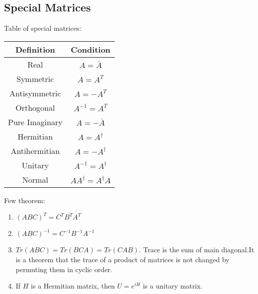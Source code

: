 \documentclass[../main.tex]{subfiles}
\begin{document}
\subsection*{Special Matrices}
Table of special matrices:
\begin{center}
    \begin{tabular}{ c c  }
     Definition & Condition  \\ 
     \hline
     Real & $A=\bar{A}$  \\  
     Symmetric & $A=A^T$ \\     
     Antisymmetric & $A=-A^T$ \\
     Orthogonal & $A^{-1}=A^T$ \\
     Pure Imaginary & $A=-\bar{A}$ \\
     Hermitian & $A=A^{\dagger}$ \\
     Antihermitian & $A=-A^{\dagger}$\\
     Unitary & $A^{-1}=A^{\dagger}$\\
     Normal & $AA^{\dagger}=A^{\dagger}A$
    \end{tabular}
\end{center}

Few theorem:
\begin{enumerate}
    \item $(ABC)^T=C^TB^TA^T$
    \item $(ABC)^{-1}=C^{-1}B^{-1}A^{-1}$
    \item $Tr(ABC)=Tr(BCA)=Tr(CAB)$.  Trace is the sum of main diagonal.It is a theorem that the
    trace of a product of matrices is not changed by permuting them in cyclic order.
    \item If $H$ is a Hermitian matrix, then $U = e^{iH}$ is a unitary matrix.
\end{enumerate}
\end{document}
